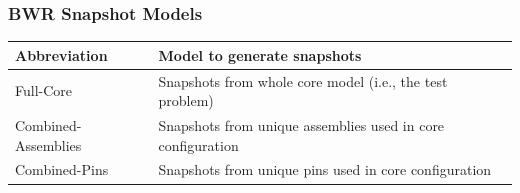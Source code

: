 \documentclass[fleqn]{beamer}
\begin{document}
  
  \begin{frame}
    \frametitle{BWR Snapshot Models}
    \begin{table}
      \begin{tabular}{l | p{6cm}}\toprule
        Abbreviation         & Model to generate snapshots \\ \midrule
        Full-Core            & Snapshots from whole core model (i.e., the test 
        problem) \\
        Combined-Assemblies  & Snapshots from unique assemblies used in core 
        configuration \\
        Combined-Pins        & Snapshots from unique pins used in core 
        configuration \\
        \bottomrule
      \end{tabular}
      \label{tab:bwrsnapshots}
    \end{table}
  \end{frame}
 
\end{document}
